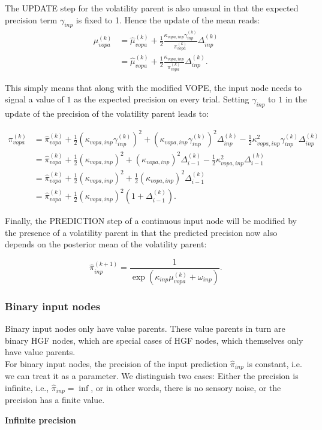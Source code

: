 The \textsf{UPDATE step} for the volatility parent is also unusual in that the expected precision term $\gamma_{inp}$ is fixed to 1. Hence the update of the mean reads:
\begin{align}
	\mu_{vopa}^{(k)} &= \hat{\mu}_{vopa}^{(k)} 
			+ \frac{1}{2} \frac{\kappa_{vopa,inp} \gamma_{inp}^{(k)}}{\pi_{vopa}^{(k)}} \Delta_{inp}^{(k)}\\
			&= \hat{\mu}_{vopa}^{(k)} 
			+ \frac{1}{2} \frac{\kappa_{vopa,inp}}{\pi_{vopa}^{(k)}} \Delta_{inp}^{(k)}.
\end{align}

This simply means that along with the modified \textsf{VOPE}, the input node needs to signal a value of $1$ as the expected precision on every trial. Setting $\gamma_{inp}$ to $1$ in the update of the precision of the volatility parent leads to:

\begin{align}
	\pi_{vopa}^{(k)} &= \hat{\pi}_{vopa}^{(k)} 
			+ \frac{1}{2} (\kappa_{vopa,inp} \gamma_{inp}^{(k)})^2 
			+ (\kappa_{vopa,inp} \gamma_{inp}^{(k)})^2 \Delta_{inp}^{(k)} 
			- \frac{1}{2} \kappa_{vopa,inp}^2 \gamma_{inp}^{(k)} \Delta_{inp}^{(k)}\\
			&= \hat{\pi}_{vopa}^{(k)} 
			+ \frac{1}{2} (\kappa_{vopa,inp})^2 
			+ (\kappa_{vopa,inp})^2 \Delta_{i-1}^{(k)} 
			- \frac{1}{2} \kappa_{vopa,inp}^2 \Delta_{i-1}^{(k)}\\
			&= \hat{\pi}_{vopa}^{(k)} 
			+ \frac{1}{2} (\kappa_{vopa,inp})^2 
			+ \frac{1}{2} (\kappa_{vopa,inp})^2 \Delta_{i-1}^{(k)}\\
			&= \hat{\pi}_{vopa}^{(k)} 
			+ \frac{1}{2} (\kappa_{vopa,inp})^2 (1 + \Delta_{i-1}^{(k)}).
\end{align}

Finally, the \textsf{PREDICTION step} of a continuous input node will be modified by the presence of a volatility parent in that the predicted precision now also depends on the posterior mean of the volatility parent:

\begin{equation}
	\hat{\pi}_{inp}^{(k+1)} = \frac{1}{\exp(\kappa_{inp} \mu_{vopa}^{(k)} + \omega_{inp})}.
\end{equation}


\subsubsection{Binary input nodes}
Binary input nodes only have value parents. These value parents in turn are binary HGF nodes, which are special cases of HGF nodes, which themselves only have value parents.\\

For binary input nodes, the precision of the input prediction $\hat{\pi}_{inp}$ is constant, i.e. we can treat it as a parameter. We distinguish two cases: Either the precision is infinite, i.e., $\hat{\pi}_{inp} = \inf$, or in other words, there is no sensory noise, or the precision has a finite value.

\textbf{Infinite precision}\\
\noindent


